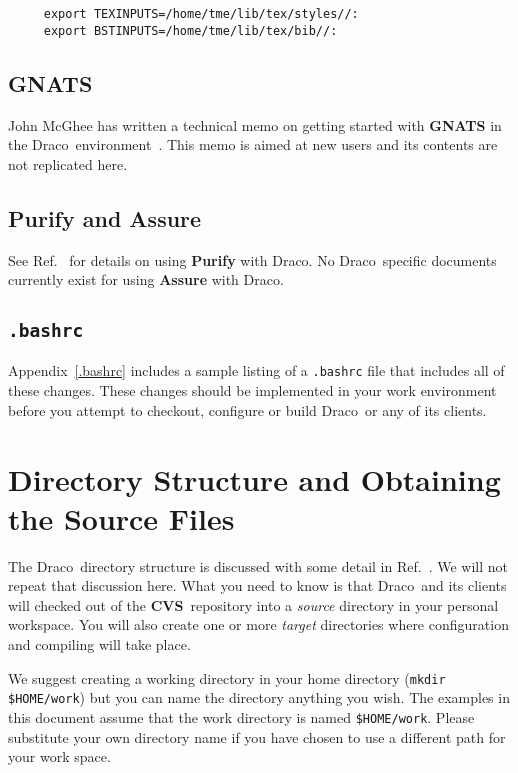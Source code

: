 \documentclass[11pt]{nmemo}
\newcommand{\comp}[1]{\normalfont\normalsize\texttt{#1}}
\newcommand{\draco}{{\normalfont\sffamily Draco}}
\newcommand{\cvs}{{\normalfont\bfseries CVS}}
\begin{document}
\begin{verbatim}
     export TEXINPUTS=/home/tme/lib/tex/styles//: 
     export BSTINPUTS=/home/tme/lib/tex/bib//:
\end{verbatim} %

\subsection{GNATS}

John McGhee has written a technical memo on getting started with
\textbf{GNATS} in the \draco\ environment~\cite{draco-gnats}.  This
memo is aimed at new users and its contents are not replicated here.

\subsection{Purify and Assure}

See Ref.~\cite{draco-purify} for details on using \textbf{Purify} with 
\draco.  No \draco\ specific documents currently exist for using
\textbf{Assure} with \draco.

\subsection{\comp{.bashrc}}

Appendix~\ref{.bashrc} includes a sample listing of a \comp{.bashrc}
file that includes all of these changes.  These changes should be
implemented in your work environment before you attempt to checkout,
configure or build \draco\ or any of its clients.


\section{Directory Structure and Obtaining the Source Files}

The \draco\ directory structure is discussed with some detail in
Ref.~\cite{draco-build}.  We will not repeat that discussion here.
What you need to know is that \draco\ and its clients will checked out 
of the \cvs\ repository into a \emph{source} directory in your
personal workspace.  You will also create one or more \emph{target}
directories where configuration and compiling will take place.

We suggest creating a working directory in your home directory
(\comp{mkdir \${HOME}/work}) but you can name the directory anything
you wish.  The examples in this document assume that the work
directory is named \comp{\${HOME}/work}.  Please substitute your own
directory name if you have chosen to use a different path for your
work space.
\end{document}

